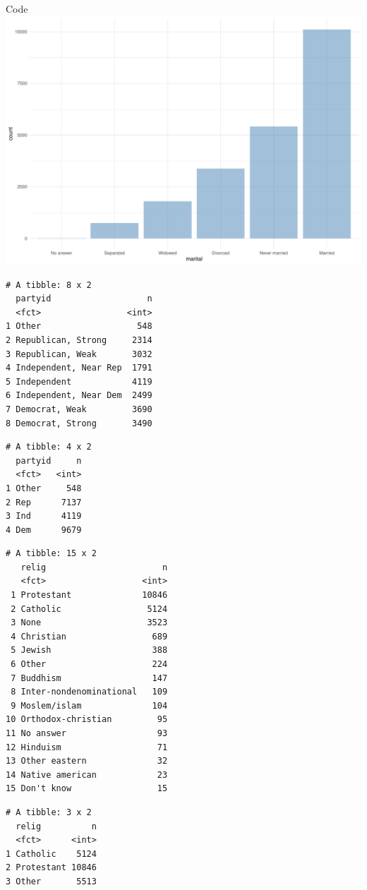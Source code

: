 \documentclass[
  ignorenonframetext,
]{beamer}
\begin{document}
\begin{frame}[fragile]{Code}
\includegraphics{gss_cat_files/figure-beamer/unnamed-chunk-1-4.pdf}

\begin{verbatim}
# A tibble: 8 x 2
  partyid                   n
  <fct>                 <int>
1 Other                   548
2 Republican, Strong     2314
3 Republican, Weak       3032
4 Independent, Near Rep  1791
5 Independent            4119
6 Independent, Near Dem  2499
7 Democrat, Weak         3690
8 Democrat, Strong       3490
\end{verbatim}

\begin{verbatim}
# A tibble: 4 x 2
  partyid     n
  <fct>   <int>
1 Other     548
2 Rep      7137
3 Ind      4119
4 Dem      9679
\end{verbatim}

\begin{verbatim}
# A tibble: 15 x 2
   relig                       n
   <fct>                   <int>
 1 Protestant              10846
 2 Catholic                 5124
 3 None                     3523
 4 Christian                 689
 5 Jewish                    388
 6 Other                     224
 7 Buddhism                  147
 8 Inter-nondenominational   109
 9 Moslem/islam              104
10 Orthodox-christian         95
11 No answer                  93
12 Hinduism                   71
13 Other eastern              32
14 Native american            23
15 Don't know                 15
\end{verbatim}

\begin{verbatim}
# A tibble: 3 x 2
  relig          n
  <fct>      <int>
1 Catholic    5124
2 Protestant 10846
3 Other       5513
\end{verbatim}


\end{frame}
\end{document}
